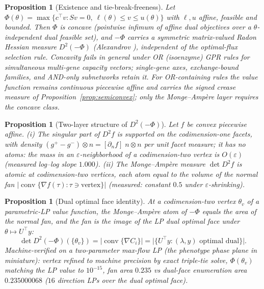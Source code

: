 \documentclass[11pt,a4paper]{article}
\theoremstyle{plain}
\newtheorem{proposition}[theorem]{Proposition}
\theoremstyle{definition}
\theoremstyle{remark}
\begin{document}
\begin{proposition}[Existence and tie-break-freeness]\label{prop:alex}
Let $\Phi(\theta) = \max\{ c^\top v : Sv = 0,\ \ell(\theta) \le v \le
u(\theta)\}$ with $\ell, u$ affine, feasible and bounded. Then $\Phi$ is
concave (pointwise infimum of affine dual objectives over a
$\theta$-independent dual feasible set), and $-\Phi$ carries a symmetric
matrix-valued Radon Hessian measure $D^2(-\Phi)$ (Alexandrov
\citep{alexandrov1939}), independent
of the optimal-flux selection rule. Concavity fails in general under OR
(isoenzyme) GPR rules for simultaneous multi-gene capacity vectors;
single-gene axes, exchange-bound families, and AND-only subnetworks
retain it. For OR-containing rules the value function remains
continuous piecewise affine and carries the signed crease measure of
Proposition~\ref{prop:semiconvex}; only the Monge--Amp\`ere layer
requires the concave class.
\end{proposition}

\begin{proposition}[Two-layer structure of $D^2(-\Phi)$]\label{prop:twolayer}
Let $f$ be convex piecewise affine. (i) The singular part of $D^2 f$ is
supported on the codimension-one facets, with density
$(g^{+} - g^{-}) \otimes n = [\partial_{n} f]\; n \otimes n$ per unit facet measure; it has no
atoms: the mass in an $\varepsilon$-neighborhood of a codimension-two
vertex is $O(\varepsilon)$ (measured log--log slope $1.000$). (ii) The
Monge--Amp\`ere measure $\det D^2 f$ is atomic at codimension-two
vertices, each atom equal to the volume of the normal fan
$|\operatorname{conv}\{\nabla f(\tau) : \tau \ni \text{vertex}\}|$
(measured: constant $0.5$ under $\varepsilon$-shrinking).
\end{proposition}

\begin{proposition}[Dual optimal face identity]\label{prop:dualface}
At a codimension-two vertex $\theta_v$ of a parametric-LP value function,
the Monge--Amp\`ere atom of $-\Phi$ equals the area of the normal fan, and
the fan is the image of the LP dual optimal face under
$\theta \mapsto U^\top y$:
\[
\det D^2(-\Phi)(\{\theta_v\})
= \bigl|\operatorname{conv}\{\nabla C_i\}\bigr|
= \bigl|\{U^\top y : (\lambda, y) \text{ optimal dual}\}\bigr|.
\]
Machine-verified on a two-parameter max-flow LP (the phenotype phase
plane in miniature): vertex refined to machine precision by exact
triple-tie solve, $\Phi(\theta_v)$ matching the LP value to
$10^{-15}$, fan area $0.235$ vs dual-face enumeration area
$0.235000068$ ($16$ direction LPs over the dual optimal face).
\end{proposition}
\end{document}
